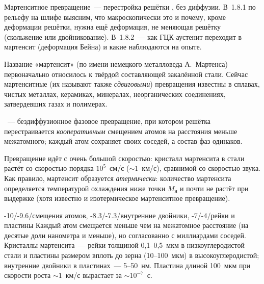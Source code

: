 \begin{orientir}
Мартенситное превращение~— перестройка решётки , без
диффузии. В~1.8.1 по рельефу на шлифе выясним, что макроскопически это
 и почему, кроме деформации
решётки, нужна ещё деформация, не меняющая решётку (скольжение или
двойникование). В~1.8.2~— как ГЦК-аустенит переходит в
мартенсит (деформация Бейна) и какие 
наблюдаются на опыте.
\end{orientir}

Название «мартенсит» (по имени немецкого металловеда А.~Мартенса)
первоначально относилось к твёрдой составляющей закалённой стали. Сейчас
мартенситные (их называют также \emph{сдвиговыми}) превращения известны в
сплавах, чистых металлах, керамиках, минералах, неорганических
соединениях, затвердевших газах и полимерах.

\begin{opredelenie}
~— бездиффузионное фазовое превращение, при
котором решётка перестраивается \emph{кооперативным} смещением атомов на
расстояния меньше межатомного; каждый атом сохраняет своих соседей, а
состав фаз одинаков.
\end{opredelenie}

Превращение идёт с очень большой скоростью: кристалл мартенсита в стали
растёт со скоростью порядка $10^5$~см/с ($\sim1$~км/с), сравнимой со
скоростью звука. Как правило, мартенсит образуется \emph{атермически}:
количество мартенсита определяется температурой охлаждения ниже точки
$M_\text{н}$ и почти не растёт при выдержке (хотя известно и изотермическое
мартенситное превращение).

\begin{masshtab}[мартенсит]{-10/-9.6/{смещения атомов}, -8.3/-7.3/{внутренние двойники}, -7/-4/{рейки и пластины}}
Каждый атом смещается меньше чем на межатомное расстояние (на десятые
доли нанометра и меньше), но согласованно с миллиардами соседей.
Кристаллы мартенсита~— рейки толщиной 0,1--0,5~мкм в низкоуглеродистой
стали и пластины размером вплоть до зерна (10--100~мкм) в
высокоуглеродистой; внутренние двойники в пластинах~— 5--50~нм.
Пластина длиной 100~мкм при скорости роста $\sim1$~км/с вырастает за
$\sim10^{-7}$~с.
\end{masshtab}

